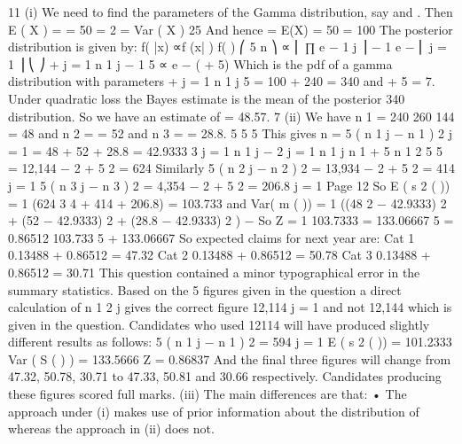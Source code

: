 11
(i)
We need to find the parameters of the Gamma distribution, say \alpha  and \lambda . Then
\alpha 
E ( X )
\lambda  = \lambda  = 50 = 2
=
\alpha 
Var ( X )
25
And hence \alpha  = E(X) \times  \lambda  = 50  = 100
The posterior distribution is given by:
f( |x) ∝f (x| ) f( )
⎛ 5
n ⎞
∝ ⎜ ∏ e −  1 j ⎟ \times  {} \alpha − 1 e −\lambda {}
⎜ j = 1
⎟
⎝
⎠
\alpha + \sum  j = 1 n 1 j − 1
5
∝ e − ( \lambda + 5)  
Which is the pdf of a gamma distribution with parameters
\alpha  +
\sum  j = 1 n 1 j
5
= 100 + 240 = 340 and \lambda  + 5 = 7.
Under quadratic loss the Bayes estimate is the mean of the posterior
340
distribution. So we have an estimate of
= 48.57.
7
(ii)
We have n 1 =
240
260
144
= 48 and n 2 =
= 52 and n 3 =
= 28.8.
5
5
5
This gives n =
5
\sum  ( n 1 j − n 1 ) 2
j = 1
=
48 + 52 + 28.8
= 42.9333
3
\sum  j = 1 n 1 j − 2 \sum  j = 1 n 1 j \times  n 1 + 5 \times  n 1 2
5
5
= 12,144 − 2   + 5  2 = 624
Similarly
5
\sum  ( n 2 j − n 2 ) 2 = 13,934 − 2   + 5  2 = 414
j = 1
5
\sum  ( n 3 j − n 3 ) 2 = 4,354 − 2   + 5  2 = 206.8
j = 1
Page 12%
So
E ( s 2 ( \theta  )) =
1  (624
3 4
+ 414 + 206.8) = 103.733
and
Var( m ( \theta  )) =
1 ((48
2
− 42.9333) 2 + (52 − 42.9333) 2 + (28.8 − 42.9333) 2 )
−
So Z =
1 
103.7333 = 133.06667
5
= 0.86512
103.733
5 +
133.06667
So expected claims for next year are:
Cat 1 0.13488  + 0.86512  = 47.32
Cat 2 0.13488  + 0.86512  = 50.78
Cat 3 0.13488  + 0.86512  = 30.71
This question contained a minor typographical error in the summary statistics. Based on the
5
figures given in the question a direct calculation of
\sum  n 1 2 j gives the correct figure 12,114
j = 1
and not 12,144 which is given in the question. Candidates who used 12114 will have
produced slightly different results as follows:
5
\sum  ( n 1 j − n 1 )
2
= 594
j = 1
E ( s 2 ( \theta  )) = 101.2333
Var ( S ( \theta  ) ) = 133.5666
Z = 0.86837
And the final three figures will change from 47.32, 50.78, 30.71 to 47.33, 50.81 and 30.66
respectively. Candidates producing these figures scored full marks.
(iii)
The main differences are that:
• The approach under (i) makes use of prior information about the
distribution of  whereas the approach in (ii) does not.
